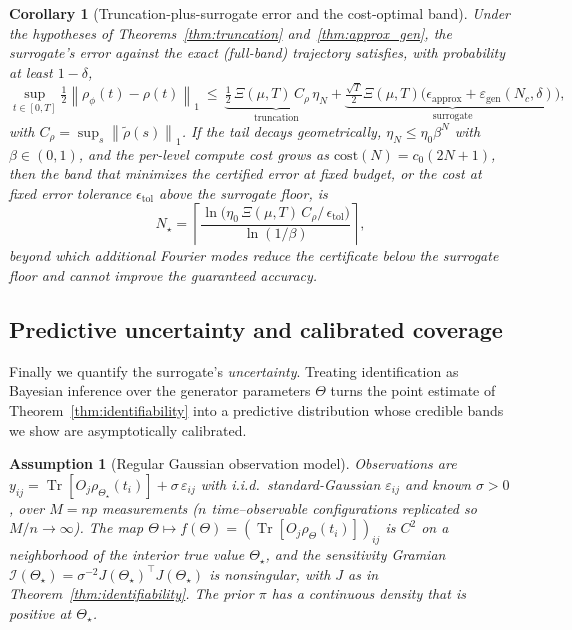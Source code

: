 \documentclass[twocolumn,aps,prxquantum,superscriptaddress,nofootinbib,floatfix,longbibliography]{revtex4-2}
\newtheorem{corollary}[theorem]{Corollary}
\newtheorem{assumption}{Assumption}
\DeclareMathOperator{\Tr}{Tr}
\newcommand{\norm}[1]{\left\lVert #1 \right\rVert}
\newcommand{\rhophi}{\rho_{\phi}}
\begin{document}
\begin{corollary}[Truncation-plus-surrogate error and the cost-optimal band]
\label{cor:optimal_truncation}
Under the hypotheses of Theorems~\ref{thm:truncation} and~\ref{thm:approx_gen}, the surrogate's error against the \emph{exact} (full-band) trajectory satisfies, with probability at least $1-\delta$,
\begin{equation}
\sup_{t\in[0,T]}\tfrac12\norm{\rhophi(t)-\rho(t)}_1
\ \le\ \underbrace{\tfrac12\,\Xi(\mu,T)\,C_\rho\,\eta_N}_{\text{truncation}}
+\underbrace{\tfrac{\sqrt T}{2}\Xi(\mu,T)\big(\epsilon_{\mathrm{approx}}+\varepsilon_{\mathrm{gen}}(N_c,\delta)\big)}_{\text{surrogate}},
\label{eq:total_error}
\end{equation}
with $C_\rho=\sup_s\norm{\widetilde\rho(s)}_1$. If the tail decays geometrically, $\eta_N\le \eta_0\beta^{N}$ with $\beta\in(0,1)$, and the per-level compute cost grows as $\mathrm{cost}(N)=c_0(2N{+}1)$, then the band that minimizes the certified error at fixed budget, or the cost at fixed error tolerance $\epsilon_{\mathrm{tol}}$ above the surrogate floor, is
\begin{equation}
N_\star=\left\lceil \frac{\ln\!\big(\eta_0\,\Xi(\mu,T)\,C_\rho/\,\epsilon_{\mathrm{tol}}\big)}{\ln(1/\beta)}\right\rceil,
\label{eq:optimal_N}
\end{equation}
beyond which additional Fourier modes reduce the certificate below the surrogate floor and cannot improve the guaranteed accuracy.
\end{corollary}

\subsection{Predictive uncertainty and calibrated coverage}
\label{sec:surrogate_uq}

Finally we quantify the surrogate's \emph{uncertainty}. Treating identification as Bayesian inference over the generator parameters $\Theta$ turns the point estimate of Theorem~\ref{thm:identifiability} into a predictive distribution whose credible bands we show are asymptotically calibrated.

\begin{assumption}[Regular Gaussian observation model]
\label{as:gaussian_obs}
Observations are $y_{ij}=\Tr[O_j\rho_{\Theta_\star}(t_i)]+\sigma\,\varepsilon_{ij}$ with i.i.d.\ standard-Gaussian $\varepsilon_{ij}$ and known $\sigma>0$, over $M=np$ measurements ($n$ time--observable configurations replicated so $M/n\to\infty$). The map $\Theta\mapsto f(\Theta)=(\Tr[O_j\rho_\Theta(t_i)])_{ij}$ is $C^2$ on a neighborhood of the interior true value $\Theta_\star$, and the sensitivity Gramian $\mathcal{I}(\Theta_\star)=\sigma^{-2}J(\Theta_\star)^\top J(\Theta_\star)$ is nonsingular, with $J$ as in Theorem~\ref{thm:identifiability}. The prior $\pi$ has a continuous density that is positive at $\Theta_\star$.
\end{assumption}
\end{document}
